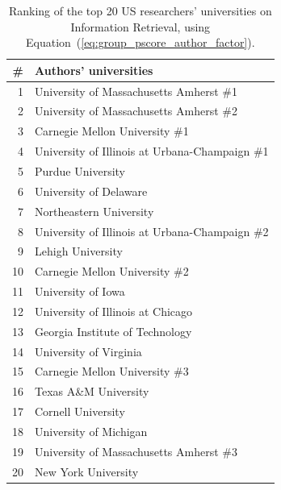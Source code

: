 \documentclass[msc]{ppgccufmg}
\begin{document}
\begin{table}[htbp]
\centering
\caption{Ranking of the top 20 US researchers' universities on Information Retrieval, using Equation~(\ref{eq:group_pscore_author_factor}).}
\label{tab:top-authors}
\begin{tabular}{rl}
    \toprule
    \# & Authors' universities \\
    \midrule
    1  & University of Massachusetts Amherst \#1        \\
    2  & University of Massachusetts Amherst \#2        \\
    3  & Carnegie Mellon University \#1                 \\
    4  & University of Illinois at Urbana-Champaign \#1 \\
    5  & Purdue University                            \\
    6  & University of Delaware                       \\
    7  & Northeastern University                      \\
    8  & University of Illinois at Urbana-Champaign \#2 \\
    9  & Lehigh University                            \\
    10 & Carnegie Mellon University \#2                 \\
    11 & University of Iowa                           \\
    12 & University of Illinois at Chicago            \\
    13 & Georgia Institute of Technology              \\
    14 & University of Virginia                       \\
    15 & Carnegie Mellon University \#3                 \\
    16 & Texas A\&M University                        \\
    17 & Cornell University                           \\
    18 & University of Michigan                       \\
    19 & University of Massachusetts Amherst \#3        \\
    20 & New York University                          \\
\bottomrule
\end{tabular}
\end{table}
\end{document}
